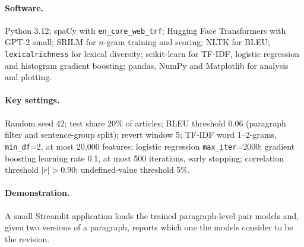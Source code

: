 \documentclass[12pt,a4paper,oneside]{report}
\begin{document}
\paragraph{Software.} Python 3.12; spaCy with \texttt{en\_core\_web\_trf}; Hugging Face Transformers with GPT-2 small; SRILM for $n$-gram training and scoring; NLTK for BLEU; \texttt{lexicalrichness} for lexical diversity; scikit-learn for TF-IDF, logistic regression and histogram gradient boosting; pandas, NumPy and Matplotlib for analysis and plotting.

\paragraph{Key settings.} Random seed 42; test share 20\% of articles; BLEU threshold 0.06 (paragraph filter and sentence-group split); revert window 5; TF-IDF word 1--2-grams, \texttt{min\_df}=2, at most 20{,}000 features; logistic regression \texttt{max\_iter}=2000; gradient boosting learning rate 0.1, at most 500 iterations, early stopping; correlation threshold $|r|>0.90$; undefined-value threshold 5\%.

\paragraph{Demonstration.} A small Streamlit application loads the trained paragraph-level pair models and, given two versions of a paragraph, reports which one the models consider to be the revision.
\end{document}
